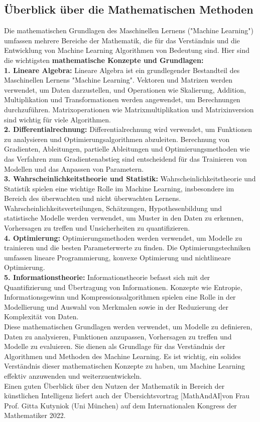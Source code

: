 \documentclass[12pt]{article}
\begin{document}
\subsection{Überblick über die Mathematischen Methoden}
Die mathematischen Grundlagen des Maschinellen Lernens ("Machine Learning") umfassen mehrere Bereiche der Mathematik, die für das Verständnis und die Entwicklung von Machine Learning Algorithmen von Bedeutung sind.
Hier sind die wichtigsten \textbf{mathematische Konzepte und Grundlagen:}\\[0.3cm]
%
\textbf{1. Lineare Algebra:} Lineare Algebra ist ein grundlegender Bestandteil des Maschinellen Lernens "Machine Learning". Vektoren und Matrizen werden verwendet, um Daten darzustellen, und Operationen wie Skalierung, Addition, Multiplikation und Transformationen werden angewendet, um Berechnungen durchzuführen. Matrixoperationen wie Matrixmultiplikation und Matrixinversion sind wichtig für viele Algorithmen.\\[0.2cm]
%
\textbf{2. Differentialrechnung:} Differentialrechnung wird verwendet, um Funktionen zu analysieren und Optimierungsalgorithmen abzuleiten. Berechnung von Gradienten, Ableitungen, partielle Ableitungen und Optimierungsmethoden wie das Verfahren zum Gradientenabstieg sind entscheidend für das Trainieren von Modellen und das Anpassen von Parametern.\\[0.2cm]
%
\textbf{3. Wahrscheinlichkeitstheorie und Statistik:} Wahrscheinlichkeitstheorie und Statistik spielen eine wichtige Rolle im Machine Learning, insbesondere im Bereich des überwachten und nicht überwachten Lernens. Wahrscheinlichkeitsverteilungen, Schätzungen, Hypothesenbildung und statistische Modelle werden verwendet, um Muster in den Daten zu erkennen, Vorhersagen zu treffen und Unsicherheiten zu quantifizieren.\\[0.2cm]
%
\textbf{4. Optimierung:} Optimierungsmethoden werden verwendet, um Modelle zu trainieren und die besten Parameterwerte zu finden. Die Optimierungstechniken umfassen lineare Programmierung, konvexe Optimierung und nichtlineare Optimierung.\\[0.2cm]
%
\textbf{5. Informationstheorie:} Informationstheorie befasst sich mit der Quantifizierung und Übertragung von Informationen. Konzepte wie Entropie, Informationsgewinn und Kompressionsalgorithmen spielen eine Rolle in der Modellierung und Auswahl von Merkmalen sowie in der Reduzierung der Komplexität von Daten.\\[0.2cm]
%
Diese mathematischen Grundlagen werden verwendet, um Modelle zu definieren, Daten zu analysieren, Funktionen anzupassen, Vorhersagen zu treffen und Modelle zu evaluieren. Sie dienen als Grundlage für das Verständnis der Algorithmen und Methoden des Machine Learning. Es ist wichtig, ein solides Verständnis dieser mathematischen Konzepte zu haben, um Machine Learning effektiv anzuwenden und weiterzuentwickeln.\\
Einen guten Überblick über den Nutzen der Mathematik in Bereich der künstlichen Intelligenz liefert auch der Übersichtsvortrag [MathAndAI]von Frau Prof. Gitta Kutyniok (Uni München) auf dem Internationalen Kongress der Mathematiker 2022.\\[0.2cm]  
% 
%
\end{document}
